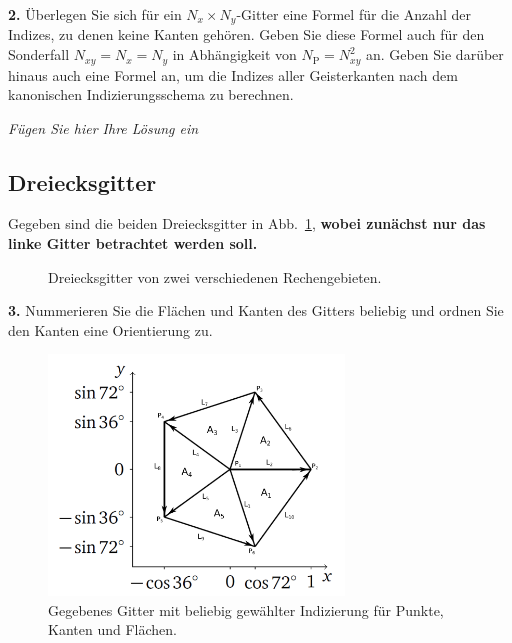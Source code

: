 \documentclass[Protokollheft.tex]{subfiles}
\begin{document}
        \begin{framed}
	\noindent \textbf{2.} \label{vorb:formel} Überlegen Sie sich für ein $N_x\times N_y$-Gitter eine Formel für die
        Anzahl der Indizes, zu denen keine Kanten gehören. Geben Sie diese Formel auch für den Sonderfall
        $N_{xy}=N_x=N_y$ in Abhängigkeit von $N_{\text{P}}=N_{xy}^2$ an. Geben Sie darüber hinaus auch eine Formel an, um die Indizes aller Geisterkanten nach dem kanonischen Indizierungsschema zu berechnen.\label{exer:nrOfGhostEdges}
\end{framed}

\emph{Fügen Sie hier Ihre Lösung ein}

%
    {\subsection{Dreiecksgitter}}
    Gegeben sind die beiden Dreiecksgitter in Abb.~\ref{fig:tetmesh}, \textbf{wobei
    zunächst nur das linke Gitter betrachtet werden soll.}
  \begin{figure}[htb]
    \centering
    \begin{subfigure}{0.49\textwidth}
        \centering
                    
    \end{subfigure}
    \begin{subfigure}{0.49\textwidth}
        \centering
        
    \end{subfigure}
    \caption{Dreiecksgitter von zwei verschiedenen Rechengebieten.}
    \label{fig:tetmesh}
  \end{figure}

        \begin{framed}
	\noindent \textbf{3.} Nummerieren Sie die Flächen und Kanten des Gitters beliebig und ordnen
                    Sie den Kanten eine Orientierung zu.\label{exer:triangleOrderedNumbering}
\end{framed}

\begin{figure}[h]
	\centering
	\includegraphics[width=0.7\textwidth]{Raster_2.png}
	\caption{Gegebenes Gitter mit beliebig gewählter Indizierung für Punkte, Kanten und Flächen.}
\end{figure}
\end{document}
